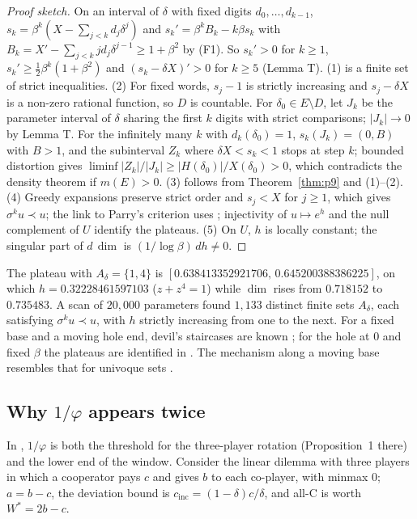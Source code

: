 \documentclass[11pt]{amsart}
\theoremstyle{remark}
\begin{document}
\begin{proof}[Proof sketch]
On an interval of $\delta$ with fixed digits $d_0,\dots,d_{k-1}$, $s_k=\beta^k(X-\sum_{j<k}d_j\delta^j)$ and $s_k'=\beta^kB_k-k\beta s_k$ with $B_k=X'-\sum_{j<k}jd_j\delta^{j-1}\ge1+\beta^2$ by (F1). So $s_k'>0$ for $k\ge1$, $s_k'\ge\frac12\beta^k(1+\beta^2)$ and $(s_k-\delta X)'>0$ for $k\ge5$ (Lemma T). (1) is a finite set of strict inequalities. (2) For fixed words, $s_j-1$ is strictly increasing and $s_j-\delta X$ is a non-zero rational function, so $D$ is countable. For $\delta_0\in E\setminus D$, let $J_k$ be the parameter interval of $\delta$ sharing the first $k$ digits with strict comparisons; $|J_k|\to0$ by Lemma T. For the infinitely many $k$ with $d_k(\delta_0)=1$, $s_k(J_k)=(0,B)$ with $B>1$, and the subinterval $Z_k$ where $\delta X<s_k<1$ stops at step $k$; bounded distortion gives $\liminf|Z_k|/|J_k|\ge|H(\delta_0)|/X(\delta_0)>0$, which contradicts the density theorem if $m(E)>0$. (3) follows from Theorem~\ref{thm:p9} and (1)--(2). (4) Greedy expansions preserve strict order and $s_j<X$ for $j\ge1$, which gives $\sigma^ku\prec u$; the link to Parry's criterion uses \cite[Lemma~2.1]{AKplat}; injectivity of $u\mapsto e^{h}$ and the null complement of $U$ identify the plateaus. (5) On $U$, $h$ is locally constant; the singular part of $d\,\dim$ is $(1/\log\beta)\,dh\ne0$.
\end{proof}

The plateau with $A_\delta=\{1,4\}$ is $[0.638413352921706,\,0.645200388386225]$, on which $h=0.32228461597103$ ($z+z^4=1$) while $\dim$ rises from $0.718152$ to $0.735483$. A scan of $20{,}000$ parameters found $1{,}133$ distinct finite sets $A_\delta$, each satisfying $\sigma^ku\prec u$, with $h$ strictly increasing from one to the next. For a fixed base and a moving hole end, devil's staircases are known \cite[Theorem~1.4, Corollary~1.5]{SLD}; for the hole at $0$ and fixed $\beta$ the plateaus are identified in \cite[Theorem~1.4]{AKplat}. The mechanism along a moving base resembles that for univoque sets \cite{KKL17}.

\subsection{\texorpdfstring{Why $1/\varphi$ appears twice}{Why 1/phi appears twice}}
In \cite{v1}, $1/\varphi$ is both the threshold for the three-player rotation (Proposition~1 there) and the lower end of the window. Consider the linear dilemma with three players in which a cooperator pays $c$ and gives $b$ to each co-player, with minmax $0$; $a=b-c$, the deviation bound is $c_{\mathrm{inc}}=(1-\delta)c/\delta$, and all-C is worth $W^*=2b-c$.
\end{document}

